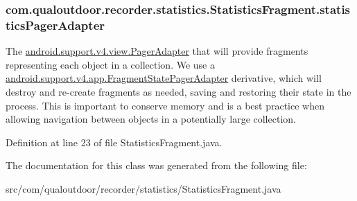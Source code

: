 \hypertarget{classcom_1_1qualoutdoor_1_1recorder_1_1statistics_1_1StatisticsFragment_ab412cc69f46b3a557a8a87e08a1639f6}{
\subsubsection[{statistics\-Pager\-Adapter}]{ com.\-qualoutdoor.\-recorder.\-statistics.\-Statistics\-Fragment.\-statistics\-Pager\-Adapter\hspace{0.3cm}{\ttfamily [private]}}}\label{classcom_1_1qualoutdoor_1_1recorder_1_1statistics_1_1StatisticsFragment_ab412cc69f46b3a557a8a87e08a1639f6}
The \hyperlink{}{android.\-support.\-v4.\-view.\-Pager\-Adapter} that will provide fragments representing each object in a collection. We use a \hyperlink{}{android.\-support.\-v4.\-app.\-Fragment\-State\-Pager\-Adapter} derivative, which will destroy and re-\/create fragments as needed, saving and restoring their state in the process. This is important to conserve memory and is a best practice when allowing navigation between objects in a potentially large collection. 

Definition at line 23 of file Statistics\-Fragment.\-java.



The documentation for this class was generated from the following file\-:\begin{DoxyCompactItemize}
\item 
src/com/qualoutdoor/recorder/statistics/Statistics\-Fragment.\-java\end{DoxyCompactItemize}
